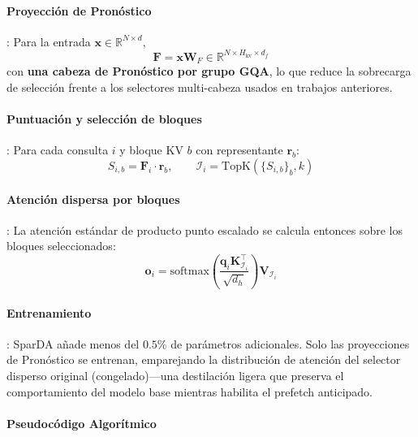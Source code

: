 \paragraph{Proyección de Pronóstico}: Para la entrada $\mathbf{x} \in \mathbb{R}^{N \times d}$,
\[
\mathbf{F} = \mathbf{x} \mathbf{W}_F \in \mathbb{R}^{N \times H_{\text{kv}} \times d_f}
\]
con \textbf{una cabeza de Pronóstico por grupo GQA}, lo que reduce la sobrecarga de selección frente a los selectores multi-cabeza usados en trabajos anteriores.

\paragraph{Puntuación y selección de bloques}: Para cada consulta $i$ y bloque KV $b$ con representante $\mathbf{r}_b$:
\[
S_{i,b} = \mathbf{F}_i \cdot \mathbf{r}_b, \qquad \mathcal{I}_i = \mathrm{TopK}(\{S_{i,b}\}_b, k)
\]
\paragraph{Atención dispersa por bloques}: La atención estándar de producto punto escalado se calcula entonces sobre los bloques seleccionados:
\[
\mathbf{o}_i = \mathrm{softmax}\left(\frac{\mathbf{q}_i \mathbf{K}_{\mathcal{I}_i}^\top}{\sqrt{d_h}}\right) \mathbf{V}_{\mathcal{I}_i}
\]
\paragraph{Entrenamiento}: SparDA añade menos del $0.5\%$ de parámetros adicionales. Solo las proyecciones de Pronóstico se entrenan, emparejando la distribución de atención del selector disperso original (congelado)---una destilación ligera que preserva el comportamiento del modelo base mientras habilita el prefetch anticipado.

\paragraph{Pseudocódigo Algorítmico}

